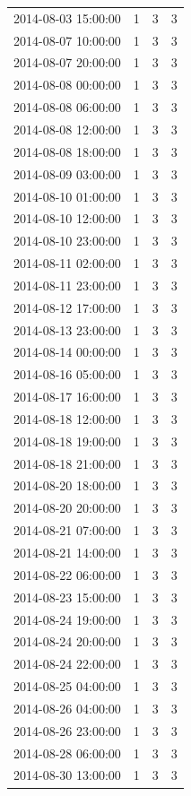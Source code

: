 \begin{tabular}{lrrr}
2014-08-03 15:00:00 & 1 & 3 & 3 \\
2014-08-07 10:00:00 & 1 & 3 & 3 \\
2014-08-07 20:00:00 & 1 & 3 & 3 \\
2014-08-08 00:00:00 & 1 & 3 & 3 \\
2014-08-08 06:00:00 & 1 & 3 & 3 \\
2014-08-08 12:00:00 & 1 & 3 & 3 \\
2014-08-08 18:00:00 & 1 & 3 & 3 \\
2014-08-09 03:00:00 & 1 & 3 & 3 \\
2014-08-10 01:00:00 & 1 & 3 & 3 \\
2014-08-10 12:00:00 & 1 & 3 & 3 \\
2014-08-10 23:00:00 & 1 & 3 & 3 \\
2014-08-11 02:00:00 & 1 & 3 & 3 \\
2014-08-11 23:00:00 & 1 & 3 & 3 \\
2014-08-12 17:00:00 & 1 & 3 & 3 \\
2014-08-13 23:00:00 & 1 & 3 & 3 \\
2014-08-14 00:00:00 & 1 & 3 & 3 \\
2014-08-16 05:00:00 & 1 & 3 & 3 \\
2014-08-17 16:00:00 & 1 & 3 & 3 \\
2014-08-18 12:00:00 & 1 & 3 & 3 \\
2014-08-18 19:00:00 & 1 & 3 & 3 \\
2014-08-18 21:00:00 & 1 & 3 & 3 \\
2014-08-20 18:00:00 & 1 & 3 & 3 \\
2014-08-20 20:00:00 & 1 & 3 & 3 \\
2014-08-21 07:00:00 & 1 & 3 & 3 \\
2014-08-21 14:00:00 & 1 & 3 & 3 \\
2014-08-22 06:00:00 & 1 & 3 & 3 \\
2014-08-23 15:00:00 & 1 & 3 & 3 \\
2014-08-24 19:00:00 & 1 & 3 & 3 \\
2014-08-24 20:00:00 & 1 & 3 & 3 \\
2014-08-24 22:00:00 & 1 & 3 & 3 \\
2014-08-25 04:00:00 & 1 & 3 & 3 \\
2014-08-26 04:00:00 & 1 & 3 & 3 \\
2014-08-26 23:00:00 & 1 & 3 & 3 \\
2014-08-28 06:00:00 & 1 & 3 & 3 \\
2014-08-30 13:00:00 & 1 & 3 & 3 \\

\end{tabular}
